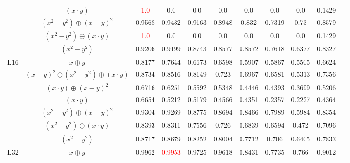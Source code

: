 \documentclass{article}
\begin{document}
\begin{table}[htbp]
\begin{tabular}{lcccccccccc}
& $(x \cdot y)$ & \textcolor{red}{1.0} & 0.0 & 0.0 & 0.0 & 0.0 & 0.0 & 0.0 & 0.1429 & \\

& $(x^2-y^2) \oplus (x-y)^2$ & 0.9568 & 0.9432 & 0.9163 & 0.8948 & 0.832 & 0.7319 & 0.73 & 0.8579 & \\

& $(x^2-y^2) \oplus (x \cdot y)$ & \textcolor{red}{1.0} & 0.0 & 0.0 & 0.0 & 0.0 & 0.0 & 0.0 & 0.1429 & \\

& $(x^2-y^2)$ & 0.9206 & 0.9199 & 0.8743 & 0.8577 & 0.8572 & 0.7618 & 0.6377 & 0.8327 & \\
\midrule
\multirow{7}{*}{L16} & $x \oplus y$ & 0.8177 & 0.7644 & 0.6673 & 0.6598 & 0.5907 & 0.5867 & 0.5505 & 0.6624 & \\

& $(x-y)^2 \oplus (x^2-y^2) \oplus (x \cdot y)$ & 0.8734 & 0.8516 & 0.8149 & 0.723 & 0.6967 & 0.6581 & 0.5313 & 0.7356 & \\

& $(x \cdot y) \oplus (x-y)^2$ & 0.6716 & 0.6251 & 0.5592 & 0.5348 & 0.4446 & 0.4393 & 0.3699 & 0.5206 & \\

& $(x \cdot y)$ & 0.6654 & 0.5212 & 0.5179 & 0.4566 & 0.4351 & 0.2357 & 0.2227 & 0.4364 & \\

& $(x^2-y^2) \oplus (x-y)^2$ & 0.9304 & 0.9269 & 0.8775 & 0.8694 & 0.8466 & 0.7989 & 0.5984 & 0.8354 & \\

& $(x^2-y^2) \oplus (x \cdot y)$ & 0.8393 & 0.8311 & 0.7556 & 0.726 & 0.6839 & 0.6594 & 0.472 & 0.7096 & \\

& $(x^2-y^2)$ & 0.8717 & 0.8679 & 0.8252 & 0.8004 & 0.7712 & 0.706 & 0.6405 & 0.7833 & \\
\midrule
\multirow{7}{*}{L32} & $x \oplus y$ & 0.9962 & \textcolor{red}{0.9953} & 0.9725 & 0.9618 & 0.8431 & 0.7735 & 0.766 & 0.9012 & \\


\end{tabular}
\end{table}
\end{document}
